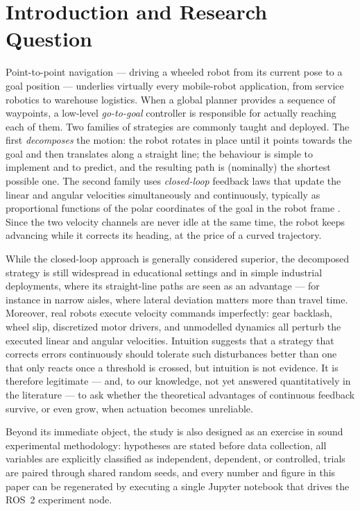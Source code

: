 \documentclass[conference]{IEEEtran}
\begin{document}
\section{Introduction and Research Question}
Point-to-point navigation --- driving a wheeled robot from its current pose to
a goal position --- underlies virtually every mobile-robot application, from
service robotics to warehouse logistics. When a global planner provides a
sequence of waypoints, a low-level \emph{go-to-goal} controller is responsible
for actually reaching each of them. Two families of strategies are commonly
taught and deployed. The first \emph{decomposes} the motion: the robot rotates
in place until it points towards the goal and then translates along a straight
line; the behaviour is simple to implement and to predict, and the resulting
path is (nominally) the shortest possible one. The second family uses
\emph{closed-loop} feedback laws that update the linear and angular
velocities simultaneously and continuously, typically as proportional
functions of the polar coordinates of the goal in the robot frame
\cite{aicardi1995closed,siegwart2011introduction}. Since the two velocity
channels are never idle at the same time, the robot keeps advancing while it
corrects its heading, at the price of a curved trajectory.

While the closed-loop approach is generally considered superior, the
decomposed strategy is still widespread in educational settings and in simple
industrial deployments, where its straight-line paths are seen as an
advantage --- for instance in narrow aisles, where lateral deviation matters
more than travel time. Moreover, real robots execute velocity commands
imperfectly: gear backlash, wheel slip, discretized motor drivers, and
unmodelled dynamics all perturb the executed linear and angular velocities.
Intuition suggests that a strategy that corrects errors continuously should
tolerate such disturbances better than one that only reacts once a threshold
is crossed, but intuition is not evidence. It is therefore legitimate --- and,
to our knowledge, not yet answered quantitatively in the literature --- to ask
whether the theoretical advantages of continuous feedback survive, or even
grow, when actuation becomes unreliable.

Beyond its immediate object, the study is also designed as an exercise in
sound experimental methodology: hypotheses are stated before data collection,
all variables are explicitly classified as independent, dependent, or
controlled, trials are paired through shared random seeds, and every number
and figure in this paper can be regenerated by executing a single Jupyter
notebook that drives the ROS~2 experiment node.
\end{document}
